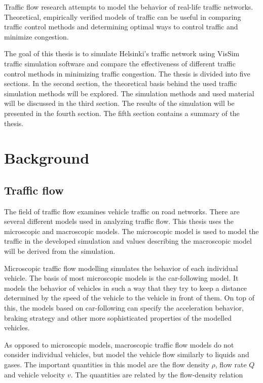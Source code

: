 \documentclass[english, 12pt, a4paper, elec, utf8, pdfa, online]{aaltothesis}
\begin{document}
Traffic flow research attempts to model the behavior of real-life traffic networks. Theoretical, empirically verified models of traffic can be useful in comparing traffic control methods and determining optimal ways to control traffic and minimize congestion.

The goal of this thesis is to simulate Helsinki's traffic network using VisSim traffic simulation software and compare the effectiveness of different traffic control methods in minimizing traffic congestion. The thesis is divided into five sections. In the second section, the theoretical basis behind the used traffic simulation methods will be explored. The simulation methods and used material will be discussed in the third section. The results of the simulation will be presented in the fourth section. The fifth section contains a summary of the thesis.

\clearpage

\section{Background}

\subsection{Traffic flow}

The field of traffic flow examines vehicle traffic on road networks. There are several different models used in analyzing traffic flow. This thesis uses the microscopic and macroscopic models. The microscopic model is used to model the traffic in the developed simulation and values describing the macroscopic model will be derived from the simulation.

Microscopic traffic flow modelling simulates the behavior of each individual vehicle. The basis of most microscopic models is the car-following model. It models the behavior of vehicles in such a way that they try to keep a distance determined by the speed of the vehicle to the vehicle in front of them. On top of this, the models based on car-following can specify the acceleration behavior, braking strategy and other more sophisticated properties of the modelled vehicles.

As opposed to microscopic models, macroscopic traffic flow models do not consider individual vehicles, but model the vehicle flow similarly to liquids and gases. The important quantities in this model are the flow density $\rho$, flow rate $Q$ and vehicle velocity $v$. The quantities are related by the flow-density relation
\end{document}
